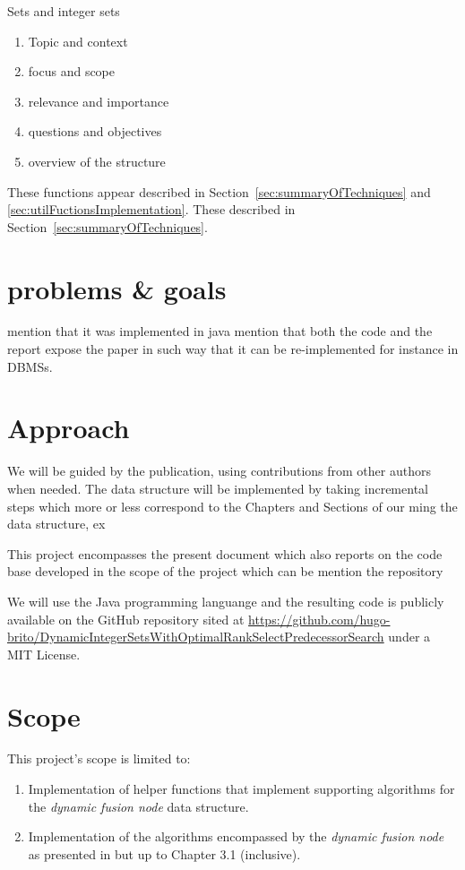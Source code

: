 Sets and integer sets


\begin{enumerate}
    \item
    Topic and context
    \item
    focus and scope
    \item
    relevance and importance
    \item
    questions and objectives
    \item
    overview of the structure
\end{enumerate}

These functions appear described in Section~\ref{sec:summaryOfTechniques} and \ref{sec:utilFuctionsImplementation}.
These  described in Section~\ref{sec:summaryOfTechniques}.

\section{problems \& goals}

mention that it was implemented in java
mention that both the code and the report expose the paper in such way that it can be re-implemented for instance in DBMSs.

\section{Approach} %

We will be guided by the \cite{patrascu2014dynamic} publication, using contributions from other authors when needed. The data structure will be implemented by taking incremental steps which more or less correspond to the Chapters and Sections of our ming the data structure, ex

This project encompasses the present document which also reports on the code base developed in the scope of the project which can be 
mention the repository



We will use the Java programming languange and the resulting code is publicly available on the GitHub repository sited at \url{https://github.com/hugo-brito/DynamicIntegerSetsWithOptimalRankSelectPredecessorSearch} under a MIT License.


\section{Scope}

This project's scope is limited to:
\begin{enumerate}
    \item
    Implementation of helper functions that implement supporting algorithms for the \textit{dynamic fusion node} data structure.
    
    \item
    Implementation of the algorithms encompassed by the \textit{dynamic fusion node} as presented in \cite{patrascu2014dynamic} but up to Chapter 3.1 (inclusive).
\end{enumerate}

